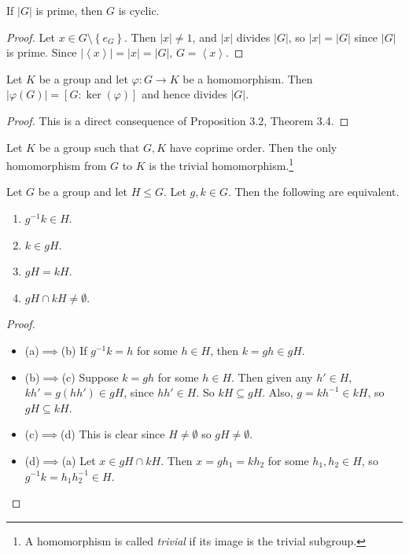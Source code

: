 \documentclass[pmath347]{subfiles}
\begin{document}
    \begin{cor}{}
        If $\left| G \right|$ is prime, then $G$ is cyclic.
    \end{cor}	

    \begin{proof}
        Let $x\in G\setminus \left\lbrace e_G \right\rbrace$. Then $\left| x \right| \neq 1$, and $\left| x \right| $ divides $\left| G \right|$, so $\left| x \right| = \left| G \right|$ since $\left| G \right|$ is prime. Since $\left| \left< x \right>   \right| = \left| x \right| = \left| G \right|$, $G=\left< x \right>$. 
    \end{proof}

    \begin{cor}{}
        Let $K$ be a group and let $\varphi:G\to K$ be a homomorphism. Then $\left| \varphi\left( G \right)  \right| = \left[ G:\ker\left( \varphi \right)  \right]$ and hence divides $\left| G \right|$.
    \end{cor}	

    \begin{proof}
        This is a direct consequence of Proposition 3.2, Theorem 3.4.
    \end{proof}

    \clearpage
    \begin{cor}{}
        Let $K$ be a group such that $G,K$ have coprime order. Then the only homomorphism from $G$ to $K$ is the trivial homomorphism.\footnote{A homomorphism is called \emph{trivial} if its image is the trivial subgroup.}
    \end{cor}	

    \begin{prop}{}
        Let $G$ be a group and let $H\leq G$. Let $g,k\in G$. Then the following are equivalent.
        \begin{enumerate}
            \item $g^{-1} k\in H$.
            \item $k\in gH$.
            \item $gH=kH$.
            \item $gH\cap kH\neq\emptyset$.
        \end{enumerate}
    \end{prop}

    \begin{proof}
        \begin{itemize}
            \item (a)$\implies$(b) If $g^{-1} k=h$ for some $h\in H$, then $k=gh\in gH$. \qqqedsym
            \item (b)$\implies$(c) Suppose $k=gh$ for some $h\in H$. Then given any $h'\in H$, $kh'=g\left( hh' \right) \in gH$, since $hh'\in H$. So $kH\subseteq gH$. Also, $g=kh^{-1} \in kH$, so $gH\subseteq kH$. \qqqedsym
            \item (c)$\implies$(d) This is clear since $H\neq\emptyset$ so $gH\neq\emptyset$. \qqqedsym
            \item (d)$\implies$(a) Let $x\in gH\cap kH$. Then $x=gh_1=kh_2$ for some $h_1,h_2\in H$, so $g^{-1} k = h_1h_2^{-1} \in H$. \qqedsym
        \end{itemize} 
    \end{proof}
    
\end{document}
